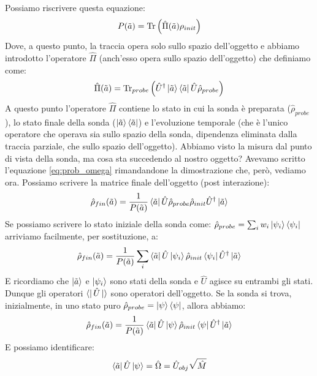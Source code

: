 Possiamo riscrivere questa equazione:
\begin{equation*}
    P(\tilde a) = \Tr \left( \hat \Pi (\tilde a) \rho_{init} \right)
\end{equation*}
Dove, a questo punto, la traccia opera solo sullo spazio dell'oggetto e abbiamo introdotto l'operatore $\hat \Pi$ (anch'esso opera sullo spazio dell'oggetto)  che definiamo come:
\begin{equation*}
    \hat \Pi (\tilde a) = \Tr_{probe}\left( \hat U ^\dagger \ket{\tilde a}\bra{\tilde a}\hat U \hat \rho_{probe}  \right)
\end{equation*}
A questo punto l'operatore $\hat \Pi$ contiene lo stato in cui la sonda è preparata ($\hat \rho_{probe}$), lo stato finale della sonda ($\ket{\tilde a}\bra{\tilde a}$) e l'evoluzione temporale (che è l'unico operatore che operava sia sullo spazio della sonda, dipendenza eliminata dalla traccia parziale, che sullo spazio dell'oggetto).
Abbiamo visto la misura dal punto di vista della sonda, ma cosa sta succedendo al nostro oggetto?
Avevamo scritto l'equazione \ref{eq:prob_omega} rimandandone la dimostrazione che, però, vediamo ora.
Possiamo scrivere la matrice finale dell'oggetto (post interazione):
\begin{equation*}
    \hat \rho_{fin} (\tilde a) = \frac{1}{P(\tilde a)}\bra{\tilde a}\hat U \hat \rho_{probe}\hat \rho_{init} \hat U^\dagger \ket{\tilde a}
\end{equation*}
Se possiamo scrivere lo stato iniziale della sonda come: $\hat \rho_{probe} = \sum_i w_i \ket{\psi_i}\bra{\psi_i}$ arriviamo facilmente, per sostituzione, a:
\begin{equation*}
    \hat \rho_{fin} (\tilde a) = \frac{1}{P(\tilde a)} \sum_i \bra{\tilde a}\hat U \ket{\psi_i}\hat \rho_{init} \bra{\psi_i}\hat U ^\dagger \ket{\tilde a}
\end{equation*}
E ricordiamo che $\ket{\tilde a}$ e $\ket{\psi_i}$ sono stati della sonda e $\hat U$ agisce su entrambi gli stati. Dunque gli operatori $\bra{}\hat U \ket{}$ sono operatori dell'oggetto.
Se la sonda si trova, inizialmente, in uno stato puro $\hat \rho_{probe} = \ket{\psi}\bra{\psi}$, allora abbiamo:
\begin{equation*}
    \hat \rho_{fin} (\tilde a) = \frac{1}{P(\tilde a)}\bra{\tilde a}\hat U \ket{\psi}\hat \rho_{init} \bra{\psi}\hat U ^\dagger \ket{\tilde a}
\end{equation*}
E possiamo identificare:
\begin{equation*}
    \bra{\tilde a} \hat U \ket{\psi} = \hat \Omega = \hat U_{obj}\sqrt{\hat M}
\end{equation*}
